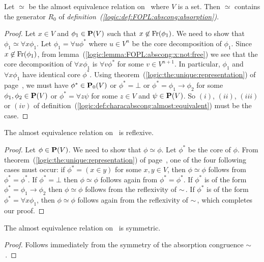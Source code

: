 \begin{prop}\label{logic:prop:characabscong:almost:contains:r0}
Let $\simeq$ be the almost equivalence relation on \pv\ where $V$ is
a set. Then $\simeq$ contains the generator $R_{0}$ of {\em
definition~(\ref{logic:def:FOPL:abscong:absorption})}.
\end{prop}
\begin{proof}
Let $x\in V$ and $\phi_{1}\in\mbox{${\bf P}(V)$}$ such that
$x\not\in\mbox{\rm Fr}(\phi_{1})$. We need to show that
$\phi_{1}\simeq\forall x \phi_{1}$. Let $\phi_{1}=\forall u\phi^{*}$
where $u\in V^{n}$ be the core decomposition of $\phi_{1}$. Since
$x\not\in\mbox{\rm Fr}(\phi_{1})$, from
lemma~(\ref{logic:lemma:FOPL:abscong:x:not:free}) we see that the
core decomposition of $\forall x\phi_{1}$ is $\forall v\phi^{*}$ for
some $v\in V^{n+1}$. In particular, $\phi_{1}$ and $\forall
x\phi_{1}$ have identical core $\phi^{*}$. Using
theorem~(\ref{logic:the:unique:representation}) of
page~\pageref{logic:the:unique:representation}, we must have
$\phi^{*}\in\mbox{${\bf P}_{0}(V)$}$ or $\phi^{*}=\bot$ or
$\phi^{*}=\phi_{1}\to\phi_{2}$ for some $\phi_{1},\phi_{2}\in\mbox{${\bf P}(V)$}$ or
$\phi^{*}=\forall z\psi$ for some $z\in V$ and $\psi\in\mbox{${\bf P}(V)$}$. So
$(i)$, $(ii)$, $(iii)$ or $(iv)$ of
definition~(\ref{logic:def:characabscong:almost:equivalent}) must be
the case.
\end{proof}

\begin{prop}\label{logic:prop:FOPL:characabscong:almost:reflexive}
The almost equivalence relation on \pv\ is reflexive.
\end{prop}
\begin{proof}
Let $\phi\in\mbox{${\bf P}(V)$}$. We need to show that $\phi\simeq\phi$. Let
$\phi^{*}$ be the core of $\phi$. From
theorem~(\ref{logic:the:unique:representation}) of
page~\pageref{logic:the:unique:representation}, one of the four
following cases must occur: if $\phi^{*}=(x\in y)$ for some $x,y\in
V$, then $\phi\simeq\phi$ follows from $\phi^{*}=\phi^{*}$. If
$\phi^{*}=\bot$ then $\phi\simeq\phi$ follows again from
$\phi^{*}=\phi^{*}$. If $\phi^{*}$ is of the form
$\phi^{*}=\phi_{1}\to\phi_{2}$ then $\phi\simeq\phi$ follows from
the reflexivity of $\sim$\,. If $\phi^{*}$ is of the form
$\phi^{*}=\forall x\phi_{1}$,  then $\phi\simeq\phi$ follows again
from the reflexivity of $\sim$\,, which completes our proof.
\end{proof}

\begin{prop}\label{logic:prop:FOPL:characabscong:almost:symmetric}
The almost equivalence relation on \pv\ is symmetric.
\end{prop}
\begin{proof}
Follows immediately from the symmetry of the absorption congruence
$\sim$\,.
\end{proof}

